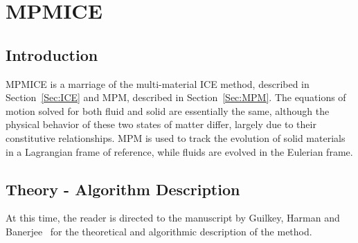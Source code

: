 
\section{MPMICE} \label{Sec:MPMICE}

\subsection{Introduction}

MPMICE is a marriage of the multi-material ICE method, described in
Section~\ref{Sec:ICE} and MPM, described in Section~\ref{Sec:MPM}.
The equations of motion solved for both fluid and solid are essentially
the same, although the physical behavior of these two states of matter
differ, largely due to their constitutive relationships.  MPM is used
to track the evolution of solid materials in a Lagrangian frame of
reference, while fluids are evolved in the Eulerian frame.

\subsection{Theory - Algorithm Description}

At this time, the reader is directed to the manuscript by Guilkey,
Harman and Banerjee~\cite{fourthmit} for the theoretical and algorithmic
description of the method.





